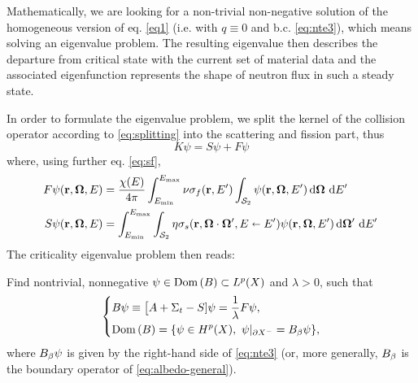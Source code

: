 Mathematically, we are looking for a non-trivial non-negative solution of the homogeneous
version of eq. \eqref{eq1} (i.e. with $q\equiv 0$ and b.c. \eqref{eq:nte3}), which means solving an eigenvalue
problem. The resulting eigenvalue then describes the departure from critical state with the current set of material
data and the associated eigenfunction represents the shape of neutron flux in such a steady state. 

In order to formulate
the eigenvalue problem, we split the kernel of the collision operator according to \eqref{eq:splitting} into the 
scattering and fission part, thus
$$
K\psi
  			= S\psi + F\psi
$$
where, using further eq. \eqref{eq:sf},
\begin{equation}\label{eq:FScrit}
\begin{aligned}
F\psi(\br,\bomega,E) &= \frac{\chi(E)}{4\pi}\intE[']{\Emin}{\Emax}{\nu\sigma_f(\br,E')\intA{\psi(\br,\bomega,E')}}\\
S\psi(\br,\bomega,E) &= \intE[']{\Emin}{\Emax}{\intA[']{\eta\sigma_s(\br,\bomega\cdot\bomega',E\sla
E')\psi(\br,\bomega,E')}}
\end{aligned}
\end{equation}
The criticality eigenvalue problem then reads:
\begin{problem}\label{prb:3}
Find nontrivial, nonnegative $\psi\in \Dom{B} \subset \Lp(X)$ and $\lambda > 0$, such that
\begin{equation}\label{eq:critical}
\left\{
  \begin{aligned}
     &B\psi \equiv \bigl[A + \Sigma_t - S]\psi = \frac{1}{\lambda} F\psi,\\
     &\Dom{B} = \{\psi\in \Hp(X),\ \psi\vert_{\pX[-]} = \albedoop\psi\},
  \end{aligned}
\right.
\end{equation}
where $\albedoop\psi$ is given by the right-hand side of \eqref{eq:nte3} (or, more generally, $\albedoop$ is the
boundary operator of \eqref{eq:albedo-general}).
\end{problem}  

